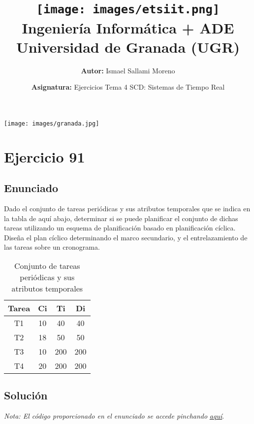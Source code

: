 \documentclass[a4paper,12pt]{article}
\title{
    \vspace{-2cm}
    \texttt{[image: images/etsiit.png]} \\ %
    \LARGE Ingeniería Informática + ADE\\
    \large Universidad de Granada (UGR)\\[1cm]
}
\author{\textbf{Autor:} Ismael Sallami Moreno}
\date{\textbf{Asignatura:} Ejercicios Tema 4 SCD: Sistemas de Tiempo Real}
\begin{document}
\maketitle
\thispagestyle{empty}

\begin{center}
    \texttt{[image: images/granada.jpg]} \\ %
    \vfill
\end{center}

\newpage

\tableofcontents
\newpage

\section{Ejercicio 91}
\subsection{Enunciado}
Dado el conjunto de tareas periódicas y sus atributos temporales que se indica en la tabla de aquí abajo, determinar si se puede planificar el conjunto de dichas tareas utilizando un esquema de planificación basado en planificación cíclica. Diseña el plan cíclico determinando el marco secundario, y el entrelazamiento de las tareas sobre un cronograma.

\begin{table}[H]
\centering
\begin{tabular}{|c|c|c|c|}
\hline
\textbf{Tarea} & \textbf{Ci} & \textbf{Ti} & \textbf{Di} \\ \hline
T1 & 10 & 40 & 40 \\ \hline
T2 & 18 & 50 & 50 \\ \hline
T3 & 10 & 200 & 200 \\ \hline
T4 & 20 & 200 & 200 \\ \hline
\end{tabular}
\caption{Conjunto de tareas periódicas y sus atributos temporales}
\end{table}

\subsection{Solución}

\begin{tcolorbox}[colback=gray!5!white,colframe=gray!75!black]
    \textit{Nota: El código proporcionado en el enunciado se accede pinchando }\href{https://github.com/ElblogdeIsmael/ElblogdeIsmael.github.io/blob/main/Asignaturas/Tercer%20A%C3%B1o/SCD/Practicas/Practicas_Resueltas/Practica4/scd-p4-fuentes/SOLUCION_ACTIVIDAD_CLASE/ejecutivo2.cpp}{\textit{aquí}}.
\end{tcolorbox}
\end{document}
